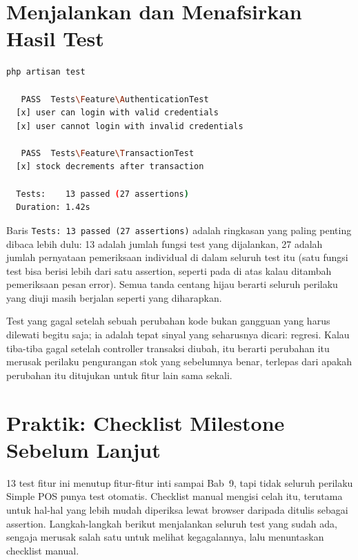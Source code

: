 \section{Menjalankan dan Menafsirkan Hasil Test}
\label{sec:pengujian-aplikasi-2}

\begin{lstlisting}[language=bash]
php artisan test

   PASS  Tests\Feature\AuthenticationTest
  [x] user can login with valid credentials
  [x] user cannot login with invalid credentials

   PASS  Tests\Feature\TransactionTest
  [x] stock decrements after transaction

  Tests:    13 passed (27 assertions)
  Duration: 1.42s
\end{lstlisting}

Baris \texttt{Tests: 13 passed (27 assertions)} adalah ringkasan yang
paling penting dibaca lebih dulu: 13 adalah jumlah fungsi test yang
dijalankan, 27 adalah jumlah pernyataan pemeriksaan individual di dalam
seluruh test itu (satu fungsi test bisa berisi lebih dari satu
assertion, seperti pada 
di atas kalau ditambah pemeriksaan pesan error). Semua tanda centang
hijau berarti seluruh perilaku yang diuji masih berjalan seperti yang
diharapkan.

\begin{warningbox}
Test yang gagal setelah sebuah perubahan kode bukan gangguan yang harus
dilewati begitu saja; ia adalah tepat sinyal yang seharusnya dicari:
regresi. Kalau
 tiba-tiba gagal
setelah controller transaksi diubah, itu berarti perubahan itu merusak
perilaku pengurangan stok yang sebelumnya benar, terlepas dari apakah
perubahan itu ditujukan untuk fitur lain sama sekali.
\end{warningbox}

\section{Praktik: Checklist Milestone Sebelum Lanjut}
\label{sec:pengujian-aplikasi-3}

13 test fitur ini menutup fitur-fitur inti sampai Bab~9, tapi tidak
seluruh perilaku Simple POS punya test otomatis. Checklist manual
mengisi celah itu, terutama untuk hal-hal yang lebih mudah diperiksa
lewat browser daripada ditulis sebagai assertion. Langkah-langkah
berikut menjalankan seluruh test yang sudah ada, sengaja merusak salah
satu untuk melihat kegagalannya, lalu menuntaskan checklist manual.

